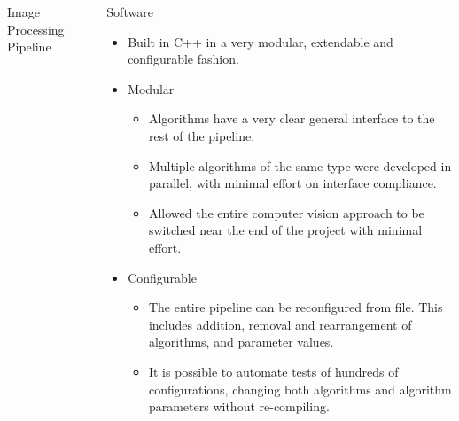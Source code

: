 \documentclass[final,hyperref={pdfpagelabels=false}]{beamer}
\begin{document}
\begin{frame}[t]
\begin{columns}[t]
\begin{column}{.465\textwidth}
\begin{block}{
\vspace*{-0.002\textheight}
Image Processing Pipeline
}
\end{block}



\end{column} %

\begin{column}{.03\textwidth}\end{column} %
 
\begin{column}{.465\textwidth} %






\begin{block}{
\vspace*{-0.002\textheight}
Software
}
\begin{itemize}
	\item Built in C++ in a very modular, extendable and configurable fashion.
\end{itemize}
	\begin{itemize}
		\item Modular
		\begin{itemize}
			\item Algorithms have a very clear general interface to the rest of the pipeline.
			\item Multiple algorithms of the same type were developed in parallel, with minimal effort on interface compliance.
			\item Allowed the entire computer vision approach to be switched near the end of the project with minimal effort.
		\end{itemize}
	\end{itemize}
	\begin{itemize}
		\item Configurable
	\begin{itemize}
		\item The entire pipeline can be reconfigured from file. This includes addition, removal and rearrangement of algorithms, and parameter values.
		\item It is possible to automate tests of hundreds of configurations, changing both algorithms and algorithm parameters without re-compiling.
	\end{itemize}
\end{itemize}
\end{block}


\end{column}
\end{columns}
\end{frame}
\end{document}
